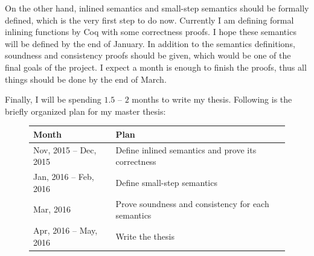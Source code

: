 On the other hand, inlined semantics and small-step semantics should
be formally defined, which is the very first step to do now. Currently
I am defining formal inlining functions by Coq with some correctness
proofs. I hope these semantics will be defined by the end of
January. In addition to the semantics definitions, soundness and
consistency proofs should be given, which would be one of the final
goals of the project. I expect a month is enough to finish the proofs,
thus all things should be done by the end of March.

Finally, I will be spending $1.5$ -- $2$ months to write my thesis.
Following is the briefly organized plan for my master thesis:

\begin{figure}[h]
  \begin{center}
    \begin{tabular}{l|l}
      \hline
      Month & Plan \\
      \hline
      Nov, 2015 -- Dec, 2015 & Define inlined semantics and prove its correctness \\
      Jan, 2016 -- Feb, 2016 & Define small-step semantics \\
      Mar, 2016 & Prove soundness and consistency for each semantics \\
      Apr, 2016 -- May, 2016 & Write the thesis \\
      \hline
    \end{tabular}
  \end{center}
\end{figure}
